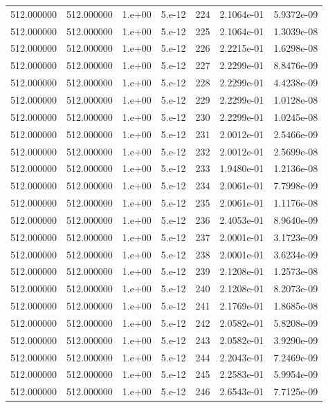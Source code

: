 \begin{table}[htbp]
\begin{tabular}{rrrrrrr}
512.000000 & 512.000000 & 1.e+00 & 5.e-12 & 224 & 2.1064e-01 & 5.9372e-09 \\
512.000000 & 512.000000 & 1.e+00 & 5.e-12 & 225 & 2.1064e-01 & 1.3039e-08 \\
512.000000 & 512.000000 & 1.e+00 & 5.e-12 & 226 & 2.2215e-01 & 1.6298e-08 \\
512.000000 & 512.000000 & 1.e+00 & 5.e-12 & 227 & 2.2299e-01 & 8.8476e-09 \\
512.000000 & 512.000000 & 1.e+00 & 5.e-12 & 228 & 2.2299e-01 & 4.4238e-09 \\
512.000000 & 512.000000 & 1.e+00 & 5.e-12 & 229 & 2.2299e-01 & 1.0128e-08 \\
512.000000 & 512.000000 & 1.e+00 & 5.e-12 & 230 & 2.2299e-01 & 1.0245e-08 \\
512.000000 & 512.000000 & 1.e+00 & 5.e-12 & 231 & 2.0012e-01 & 2.5466e-09 \\
512.000000 & 512.000000 & 1.e+00 & 5.e-12 & 232 & 2.0012e-01 & 2.5699e-08 \\
512.000000 & 512.000000 & 1.e+00 & 5.e-12 & 233 & 1.9480e-01 & 1.2136e-08 \\
512.000000 & 512.000000 & 1.e+00 & 5.e-12 & 234 & 2.0061e-01 & 7.7998e-09 \\
512.000000 & 512.000000 & 1.e+00 & 5.e-12 & 235 & 2.0061e-01 & 1.1176e-08 \\
512.000000 & 512.000000 & 1.e+00 & 5.e-12 & 236 & 2.4053e-01 & 8.9640e-09 \\
512.000000 & 512.000000 & 1.e+00 & 5.e-12 & 237 & 2.0001e-01 & 3.1723e-09 \\
512.000000 & 512.000000 & 1.e+00 & 5.e-12 & 238 & 2.0001e-01 & 3.6234e-09 \\
512.000000 & 512.000000 & 1.e+00 & 5.e-12 & 239 & 2.1208e-01 & 1.2573e-08 \\
512.000000 & 512.000000 & 1.e+00 & 5.e-12 & 240 & 2.1208e-01 & 8.2073e-09 \\
512.000000 & 512.000000 & 1.e+00 & 5.e-12 & 241 & 2.1769e-01 & 1.8685e-08 \\
512.000000 & 512.000000 & 1.e+00 & 5.e-12 & 242 & 2.0582e-01 & 5.8208e-09 \\
512.000000 & 512.000000 & 1.e+00 & 5.e-12 & 243 & 2.0582e-01 & 3.9290e-09 \\
512.000000 & 512.000000 & 1.e+00 & 5.e-12 & 244 & 2.2043e-01 & 7.2469e-09 \\
512.000000 & 512.000000 & 1.e+00 & 5.e-12 & 245 & 2.2583e-01 & 5.9954e-09 \\
512.000000 & 512.000000 & 1.e+00 & 5.e-12 & 246 & 2.6543e-01 & 7.7125e-09 \\

\end{tabular}
\end{table}
